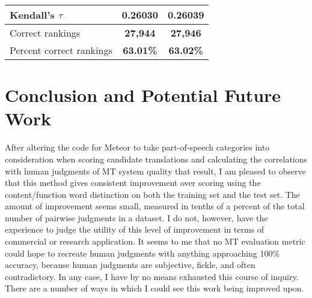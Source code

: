 \documentclass[paper=a4, fontsize=11pt]{scrartcl}
\numberwithin{equation}{section}		%
\numberwithin{figure}{section}			%
\numberwithin{table}{section}				%
\begin{document}
\begin{table}[]
{\begin{tabular}{llclllclll}
\multicolumn{2}{|l|}{Kendall's $\tau$}                                                                                                                                       & \multicolumn{4}{c|}{{\bf 0.26030}}                                                                                & \multicolumn{4}{c|}{{\bf 0.26039}}                                                                                \\ \hline
\multicolumn{2}{|l|}{Correct rankings}                                                                                                                                       & \multicolumn{4}{c|}{{\bf 27,944}}                                                                                 & \multicolumn{4}{c|}{{\bf 27,946}}                                                                                 \\ \hline
\multicolumn{2}{|l|}{Percent correct rankings}                                                                                                                               & \multicolumn{4}{c|}{{\bf 63.01\%}}                                                                                & \multicolumn{4}{c|}{{\bf 63.02\%}}                                                                                \\ \hline
\end{tabular}}
\end{table}

\section{Conclusion and Potential Future Work}

After altering the code for Meteor to take part-of-speech categories into consideration when scoring candidate translations and calculating the correlations with human judgments of MT system quality that result, I am pleased to observe that this method gives consistent improvement over scoring using the content/function word distinction on both the training set and the test set.  The amount of improvement seems small, measured in tenths of a percent of the total number of pairwise judgments in a dataset.  I do not, however, have the experience to judge the utility of this level of improvement in terms of commercial or research application.  It seems to me that no MT evaluation metric could hope to recreate human judgments with anything approaching 100\% accuracy, because human judgments are subjective, fickle, and often contradictory.  In any case, I have by no means exhausted this course of inquiry.  There are a number of ways in which I could see this work being improved upon.
\end{document}
